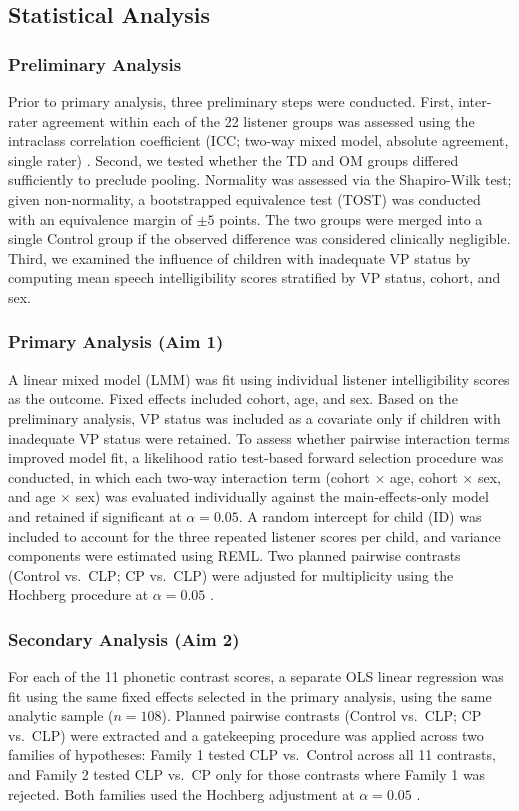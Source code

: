 \documentclass[11pt]{article}
\begin{document}
\subsection*{Statistical Analysis}\label{sec:stats}
\subsubsection*{Preliminary Analysis}
Prior to primary analysis, three preliminary steps were conducted. First,
inter-rater agreement within each of the 22 listener groups was assessed
using the intraclass correlation coefficient (ICC; two-way mixed model,
absolute agreement, single rater) \cite{koo2016}. Second, we tested whether
the TD and OM groups differed sufficiently to preclude pooling. Normality was
assessed via the Shapiro-Wilk test; given non-normality, a bootstrapped
equivalence test (TOST) was conducted with an equivalence margin of $\pm5$
points. The two groups were merged into a single Control group if the observed
difference was considered clinically negligible. Third, we examined the
influence of children with inadequate VP status by computing mean speech
intelligibility scores stratified by VP status, cohort, and sex.

\subsubsection*{Primary Analysis (Aim 1)}
A linear mixed model (LMM) was fit using individual listener intelligibility
scores as the outcome. Fixed effects included cohort, age, and sex.
Based on the preliminary analysis, VP status was included as a covariate
only if children with inadequate VP status were retained. To assess whether pairwise interaction terms
improved model fit, a likelihood ratio test-based forward selection procedure
was conducted, in which each two-way interaction term (cohort $\times$ age,
cohort $\times$ sex, and age $\times$ sex) was evaluated individually against
the main-effects-only model and retained if significant at $\alpha = 0.05$.
A random intercept for child (ID) was included to account for the three repeated listener scores per child, and variance components were estimated using REML. Two planned pairwise contrasts (Control vs.\ CLP; CP vs.\ CLP)
were adjusted for multiplicity using the Hochberg procedure at $\alpha = 0.05$
\cite{hochberg1988}.

\subsubsection*{Secondary Analysis (Aim 2)}
For each of the 11 phonetic contrast scores, a separate OLS linear
regression was fit using the same fixed effects selected in the primary
analysis, using the same analytic sample ($n = 108$). Planned pairwise
contrasts (Control vs.\ CLP; CP vs.\ CLP) were extracted and a gatekeeping
procedure \cite{bretz2009} was applied across two families of hypotheses:
Family 1 tested CLP vs.\ Control across all 11 contrasts, and Family 2 tested
CLP vs.\ CP only for those contrasts where Family 1 was rejected. Both
families used the Hochberg adjustment at $\alpha = 0.05$ \cite{hochberg1988}.
\end{document}
